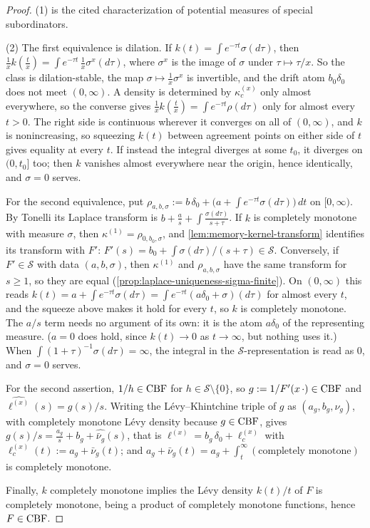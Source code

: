 \begin{proof}
\leanok
(1) is the cited characterization of potential measures of special subordinators.

(2) The first equivalence is dilation. If $k(t) = \int e^{-\tau t}\sigma(d\tau)$, then
$\tfrac1x k(\tfrac tx) = \int e^{-\tau t}\,\tfrac1x\sigma^{x}(d\tau)$, where $\sigma^{x}$ is the image
of $\sigma$ under $\tau \mapsto \tau/x$. So the class is dilation-stable, the map
$\sigma \mapsto \tfrac1x\sigma^{x}$ is invertible, and the drift atom $b_0\delta_0$ does not meet
$(0,\infty)$. A density is determined by $\kappa_c^{(x)}$ only almost everywhere, so the converse
gives $\tfrac1x k(\tfrac tx) = \int e^{-\tau t}\rho(d\tau)$ only for almost every $t > 0$. The right
side is continuous wherever it converges on all of $(0,\infty)$, and $k$ is nonincreasing, so
squeezing $k(t)$ between agreement points on either side of $t$ gives equality at every $t$. If
instead the integral diverges at some $t_0$, it diverges on $(0,t_0]$ too; then $k$ vanishes almost
everywhere near the origin, hence identically, and $\sigma = 0$ serves.

For the second equivalence, put
$\rho_{a,b,\sigma} := b\,\delta_0 + \bigl(a + \int e^{-\tau t}\sigma(d\tau)\bigr)\,dt$ on
$[0,\infty)$. By Tonelli its Laplace transform is $b + \tfrac as + \int \tfrac{\sigma(d\tau)}{s+\tau}$.
If $k$ is completely monotone with measure $\sigma$, then $\kappa^{(1)} = \rho_{0,b_0,\sigma}$, and
\ref{lem:memory-kernel-transform} identifies its transform with $F'$:
$F'(s) = b_0 + \int \sigma(d\tau)/(s+\tau) \in \mathcal{S}$. Conversely, if $F' \in \mathcal{S}$ with
data $(a,b,\sigma)$, then $\kappa^{(1)}$ and $\rho_{a,b,\sigma}$ have the same transform for
$s \ge 1$, so they are equal (\ref{prop:laplace-uniqueness-sigma-finite}). On $(0,\infty)$ this reads
$k(t) = a + \int e^{-\tau t}\sigma(d\tau) = \int e^{-\tau t}(a\delta_0 + \sigma)(d\tau)$ for almost
every $t$, and the squeeze above makes it hold for every $t$, so $k$ is completely monotone. The
$a/s$ term needs no argument of its own: it is the atom $a\delta_0$ of the representing measure.
($a = 0$ does hold, since $k(t) \to 0$ as $t \to \infty$, but nothing uses it.) When
$\int (1+\tau)^{-1}\sigma(d\tau) = \infty$, the integral in the $\mathcal{S}$-representation is
read as $0$, and $\sigma = 0$ serves.

For the second assertion, $1/h \in \mathrm{CBF}$ for $h \in \mathcal{S}\setminus\{0\}$, so
$g := 1/F'(x\,\cdot) \in \mathrm{CBF}$ and $\widehat{\ell^{(x)}}(s) = g(s)/s$. Writing the
Lévy--Khintchine triple of $g$ as $(a_g, b_g, \nu_g)$, with completely monotone Lévy density
because $g \in \mathrm{CBF}$, gives
$g(s)/s = \tfrac{a_g}{s} + b_g + \widehat{\bar\nu_g}(s)$, that is
$\ell^{(x)} = b_g\,\delta_0 + \ell_c^{(x)}$ with
$\ell_c^{(x)}(t) := a_g + \bar\nu_g(t)$; and
$a_g + \bar\nu_g(t) = a_g + \int_t^\infty(\text{completely monotone})$ is completely monotone.

Finally, $k$ completely monotone implies the Lévy density $k(t)/t$ of $F$ is completely
monotone, being a product of completely monotone functions, hence $F \in \mathrm{CBF}$.
\end{proof}

